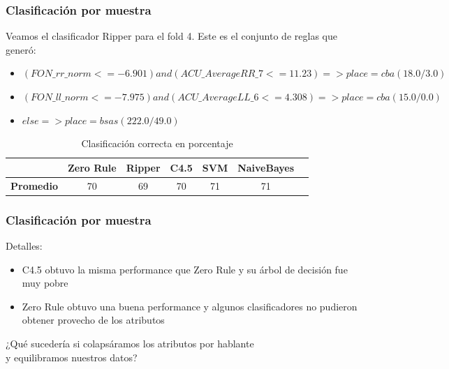 \documentclass[mathserif]{beamer}%
\begin{document}
\begin{frame}
	\frametitle{Clasificación por muestra}
	
	Veamos el clasificador Ripper para el fold 4. Este es el conjunto de reglas que generó:
	
	\begin{flushleft}
		\begin{itemize}
			\item $(FON\_rr\_norm <= -6.901) and (ACU\_AverageRR\_7 <= 11.23) => place=cba (18.0/3.0)$ \\
			\item $(FON\_ll\_norm <= -7.975) and (ACU\_AverageLL\_6 <= 4.308) => place=cba (15.0/0.0)$
			\item $else => place=bsas (222.0/49.0)$
		\end{itemize}
	\end{flushleft}
	
	\begin{table}[H]
		\centering
		\begin{tabular}{|l|c|c|c|c|c|c|}
			\hline
			\textbf{}  & \textbf{Zero Rule} & \textbf{Ripper} & \textbf{C4.5} & \textbf{SVM} & \textbf{NaiveBayes} \\ \hline
			\textbf{Promedio} & 70  & 69 & 70 & 71 & 71 \\ \hline
		\end{tabular}
		\caption{Clasificación correcta en porcentaje}
		\label{HPTDT_clas_xval_porHab}
	\end{table}
	
\end{frame}

\begin{frame}
	\frametitle{Clasificación por muestra}
	
	Detalles:
	
	\begin{itemize}
		\item C4.5 obtuvo la misma performance que Zero Rule y su árbol de decisión fue muy pobre  
		\item Zero Rule obtuvo una buena performance y algunos clasificadores no pudieron obtener provecho de los atributos
	\end{itemize}
	
	\pause
	
	\begin{center}
		¿Qué sucedería si colapsáramos los atributos por hablante \\ y equilibramos nuestros datos?
	\end{center}
	
\end{frame}
\end{document}

